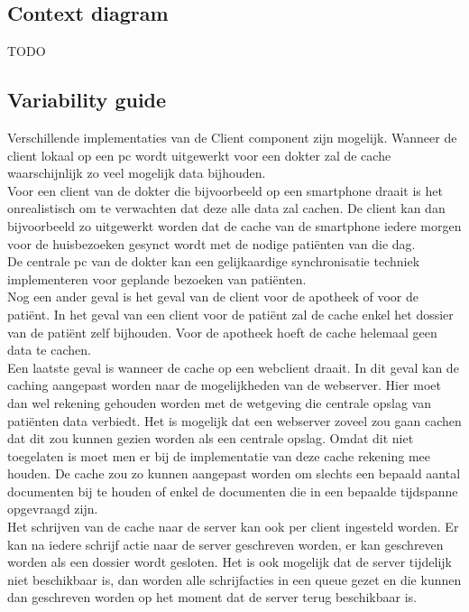 \documentclass[a4paper,10pt]{book}
\begin{document}
\subsection{Context diagram}
TODO

\subsection{Variability guide}
Verschillende implementaties van de Client component zijn mogelijk.  Wanneer de client lokaal op een pc wordt uitgewerkt voor een dokter zal de cache waarschijnlijk zo veel mogelijk data bijhouden.\\
Voor een client van de dokter die bijvoorbeeld op een smartphone draait is het onrealistisch om te verwachten dat deze alle data zal cachen.  De client kan dan bijvoorbeeld zo uitgewerkt worden dat de cache van de smartphone iedere morgen voor de huisbezoeken gesynct wordt met de nodige pati\"{e}nten van die dag.\\
De centrale pc van de dokter kan een gelijkaardige synchronisatie techniek implementeren voor geplande bezoeken van pati\"{e}nten.\\
Nog een ander geval is het geval van de client voor de apotheek of voor de pati\"{e}nt.  In het geval van een client voor de pati\"{e}nt zal de cache enkel het dossier van de pati\"{e}nt zelf bijhouden.  Voor de apotheek hoeft de cache helemaal geen data te cachen.\\
Een laatste geval is wanneer de cache op een webclient draait.  In dit geval kan de caching aangepast worden naar de mogelijkheden van de webserver.  Hier moet dan wel rekening gehouden worden met de wetgeving die centrale opslag van pati\"{e}nten data verbiedt.  Het is mogelijk dat een webserver zoveel zou gaan cachen dat dit zou kunnen gezien worden als een centrale opslag.  Omdat dit niet toegelaten is moet men er bij de implementatie van deze cache rekening mee houden.  De cache zou zo kunnen aangepast worden om slechts een bepaald aantal documenten bij te houden of enkel de documenten die in een bepaalde tijdspanne opgevraagd zijn.\\
Het schrijven van de cache naar de server kan ook per client ingesteld worden.  Er kan na iedere schrijf actie naar de server geschreven worden, er kan geschreven worden als een dossier wordt gesloten.  Het is ook mogelijk dat de server tijdelijk niet beschikbaar is, dan worden alle schrijfacties in een queue gezet en die kunnen dan geschreven worden op het moment dat de server terug beschikbaar is.
\end{document}
